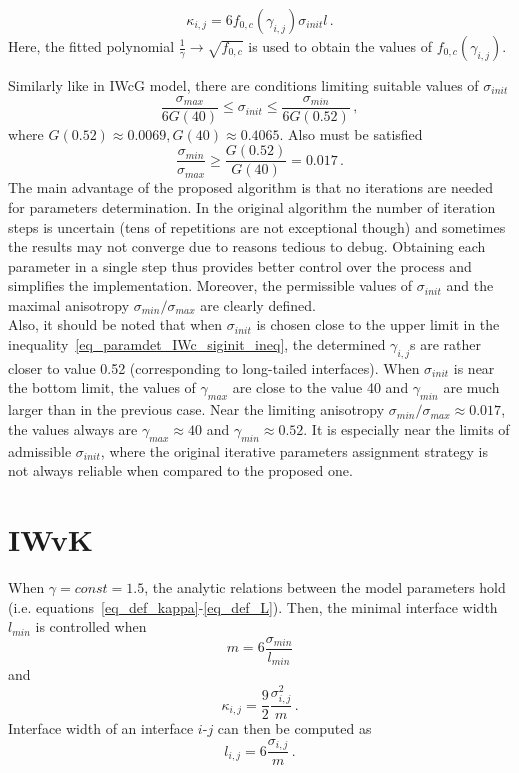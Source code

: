 \begin{equation}
	\kappa_{i,j}=6f_{0,c}(\gamma_{i,j})\sigma_{init}l \,.
\end{equation}
Here, the fitted polynomial $\frac{1}{\gamma} \rightarrow \sqrt{f_{0,c}}$ is used to obtain the values of $f_{0,c}(\gamma_{i,j})$.

Similarly like in IWcG model, there are conditions limiting suitable values of $\sigma_{init}$
\begin{equation} \label{eq_paramdet_IWc_siginit_ineq}
	\frac{\sigma_{max}}{6G(40)} \leq \sigma_{init} \leq \frac{\sigma_{min}}{6G(0.52)} \,,
\end{equation}
where $G(0.52)\approx0.0069, G(40)\approx0.4065$. Also must be satisfied
\begin{equation}
	\frac{\sigma_{min}}{\sigma_{max}} \geq\frac{G(0.52)}{G(40)} = 0.017 \,. 
\end{equation}
The main advantage of the proposed algorithm is that no iterations are needed for parameters determination. In the original algorithm the number of iteration steps is uncertain (tens of repetitions are not exceptional though) and sometimes the results may not converge due to reasons tedious to debug. Obtaining each parameter in a single step thus provides better control over the process and simplifies the implementation. Moreover, the permissible values of $\sigma_{init}$ and the maximal anisotropy $\sigma_{min}/\sigma_{max}$ are clearly defined. \\
Also, it should be noted that when $\sigma_{init}$ is chosen close to the upper limit in the inequality~\ref{eq_paramdet_IWc_siginit_ineq}, the determined $\gamma_{i,j}$s are rather closer to value 0.52 (corresponding to long-tailed interfaces). When $\sigma_{init}$ is near the bottom limit, the values of $\gamma_{max}$ are close to the value 40 and $\gamma_{min}$ are much larger than in the previous case. Near the limiting anisotropy $\sigma_{min}/\sigma_{max}\approx0.017$, the values always are $\gamma_{max}\approx40$ and $\gamma_{min}\approx0.52$. It is especially near the limits of admissible $\sigma_{init}$, where the original iterative parameters assignment strategy is not always reliable when compared to the proposed one.

\section{IWvK}
When $\gamma=const=1.5$, the analytic relations between the model parameters hold (i.e. equations~\eqref{eq_def_kappa}-\eqref{eq_def_L}). Then, the minimal interface width $l_{min}$ is controlled when
\begin{equation}
	m = 6\frac{\sigma_{min}}{l_{min}}
\end{equation}
and
\begin{equation}
	\kappa_{i,j}=\frac{9}{2}\frac{\sigma_{i,j}^2}{m} \,.
\end{equation}
Interface width of an interface $i$-$j$ can then be computed as
\begin{equation}
	l_{i,j} = 6\frac{\sigma_{i,j}}{m} \,.
\end{equation}

\cleardoublepage

